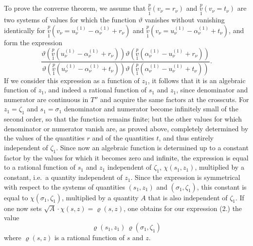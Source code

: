 \documentclass{article}
\begin{document}
To prove the converse theorem, we assume that $\overset{p}{\underset{1}{v}}(v_\nu = r_\nu)$ and $\overset{p}{\underset{1}{v}}(v_\nu = t_\nu)$ are two systems of values for which the function $\vartheta$ vanishes without vanishing identically for $\overset{p}{\underset{1}{v}}(v_\nu = u_\nu^{(1)} - \alpha_\nu^{(1)} + r_\nu)$ and $\overset{p}{\underset{1}{v}}(v_\nu = u_\nu^{(1)} - \alpha_\nu^{(1)} + t_\nu)$, and form the expression
\[
\tag{(2.)}
\frac{\vartheta\left(\overset{p}{\underset{1}{v}}(u_\nu^{(1)} - \alpha_\nu^{(1)} + r_\nu)\right)\vartheta\left(\overset{p}{\underset{1}{v}}(\alpha_\nu^{(1)} - u_\nu^{(1)} + r_\nu)\right)}{\vartheta\left(\overset{p}{\underset{1}{v}}(u_\nu^{(1)} - \alpha_\nu^{(1)} + t_\nu)\right)\vartheta\left(\overset{p}{\underset{1}{v}}(\alpha_\nu^{(1)} - u_\nu^{(1)} + t_\nu)\right)}.
\]
If we consider this expression as a function of $z_1$, it follows that it is an algebraic function of $z_1$, and indeed a rational function of $s_1$ and $z_1$, since denominator and numerator are continuous in $T''$ and acquire the same factors at the crosscuts. For $z_1 = \zeta_1$ and $s_1 = \sigma_1$ denominator and numerator become infinitely small of the second order, so that the function remains finite; but the other values for which denominator or numerator vanish are, as proved above, completely determined by the values of the quantities $r$ and of the quantities $t$, and thus entirely independent of $\zeta_1$. Since now an algebraic function is determined up to a
constant factor by the values for which it becomes zero and infinite, the expression is equal to a rational function of $s_1$ and $z_1$ independent of $\zeta_1$, $\chi(s_1, z_1)$, multiplied by a constant, i.e.\ a quantity independent of $z_1$. Since the expression is symmetrical with respect to the systems of quantities $(s_1, z_1)$ and $(\sigma_1, \zeta_1)$, this constant is equal to $\chi(\sigma_1, \zeta_1)$, multiplied by a quantity $A$ that is also independent of $\zeta_1$. If one now sets $\sqrt{A}\cdot\chi(s, z) = \varrho(s, z)$, one obtains for our expression (2.) the value
\[
\tag{(3.)}
\varrho(s_1, z_1)\,\varrho(\sigma_1, \zeta_1)
\]
where $\varrho(s, z)$ is a rational function of $s$ and $z$.
\end{document}
